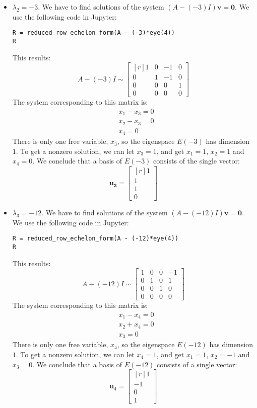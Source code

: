 \documentclass[12pt]{article}
\begin{document}
\begin{itemize}
\item $\lambda_2=-3$. We have to find solutions of the system $(A-(-3)I)\mathbf{v}=\mathbf{0}$. We use the following code in Jupyter:
\begin{lstlisting}
R = reduced_row_echelon_form(A - (-3)*eye(4))
R\end{lstlisting}
This results:
\[
A-(-3)I\sim\left[\begin{matrix*}[r]1 & 0 & -1 & 0\\0 & 1 & -1 & 0\\0 & 0 & 0 & 1\\0 & 0 & 0 & 0\end{matrix*}\right]
\]
The system corresponding to this matrix is:
\begin{align*}
&x_1-x_3=0\\
&x_2-x_3=0\\
&x_4=0
\end{align*}
There is only one free variable, $x_3$, so the eigenspace $E(-3)$ has dimension $1$.
To get a nonzero solution, we can let $x_3=1$, and get $x_1=1$, $x_2=1$ and $x_4=0$. We conclude that a basis of $E(-3)$ consists of the single vector:
\[
\mathbf{u_3}=\begin{bmatrix*}[r]1\\1\\1\\0\end{bmatrix*}
\]

\item $\lambda_3=-12$. We have to find solutions of the system $(A-(-12)I)\mathbf{v}=\mathbf{0}$. We use the following code in Jupyter:
\begin{lstlisting}
R = reduced_row_echelon_form(A - (-12)*eye(4))
R\end{lstlisting}
This results:
\[
A-(-12)I\sim\left[\begin{matrix}1 & 0 & 0 & -1\\0 & 1 & 0 & 1\\0 & 0 & 1 & 0\\0 & 0 & 0 & 0\end{matrix}\right]
\]
The system corresponding to this matrix is:
\begin{align*}
&x_1-x_4=0\\
&x_2+x_4=0\\
&x_3=0
\end{align*}
There is only one free variable, $x_4$, so the eigenspace $E(-12)$ has dimension $1$.
To get a nonzero solution, we can let $x_4=1$, and get $x_1=1$, $x_2=-1$ and $x_3=0$. We conclude that a basis of $E(-12)$ consists of a single vector:
\[
\mathbf{u}_4=\left[\begin{matrix*}[r]1\\-1\\0\\1\end{matrix*}\right]
\]
\end{itemize}
\end{document}
